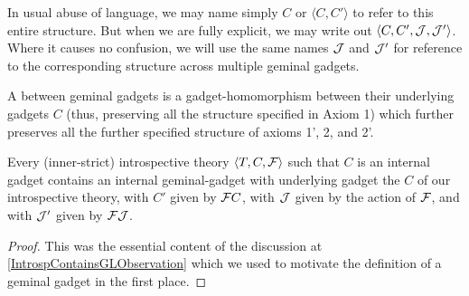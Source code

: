 \begin{definition}
In usual abuse of language, we may name simply $C$ or $\langle C, C' \rangle$ to refer to this entire structure. But when we are fully explicit, we may write out $\langle C, C', \mathcal{J}, \mathcal{J}' \rangle$. Where it causes no confusion, we will use the same names $\mathcal{J}$ and $\mathcal{J}'$ for reference to the corresponding structure across multiple geminal gadgets.


A  between geminal gadgets is a gadget-homomorphism between their underlying gadgets $C$ (thus, preserving all the structure specified in Axiom 1) which further preserves all the further specified structure of axioms 1', 2, and 2'.
\end{definition}

\begin{theorem}\label{IntrospContainsGL}
Every (inner-strict) introspective theory $\langle T, C, \mathcal{F} \rangle$ such that $C$ is an internal gadget contains an internal geminal-gadget with underlying gadget the $C$ of our introspective theory, with $C'$ given by $\mathcal{F} C$, with $\mathcal{J}$ given by the action of $\mathcal{F}$, and with $\mathcal{J}'$ given by $\mathcal{F} \mathcal{J}$.
\end{theorem}
\begin{proof}
This was the essential content of the discussion at \cref{IntrospContainsGLObservation} which we used to motivate the definition of a geminal gadget in the first place.
\end{proof}

